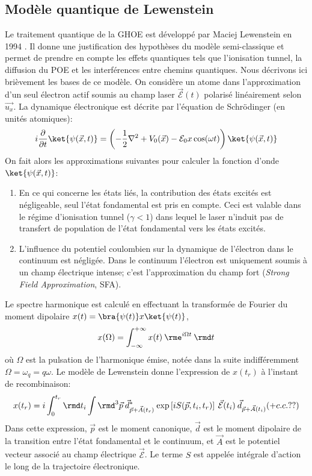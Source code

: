 \subsection{Modèle quantique de Lewenstein}
Le traitement quantique de la GHOE est développé par Maciej Lewenstein en 1994 . Il donne une justification des hypothèses du modèle semi-classique et permet de prendre en compte les effets quantiques tels que l'ionisation tunnel, la diffusion du POE et les interférences entre chemins quantiques. Nous décrivons ici brièvement les bases de ce modèle. On considère un atome dans l'approximation d'un seul électron actif soumis au champ laser $\vec{\mathcal{E}}(t)$ polarisé linéairement selon $\vec{u_x}$. La dynamique électronique est décrite par l'équation de Schrödinger (en unités atomiques):
\begin{equation}
i \frac{\partial}{\partial t} \ket{\psi(\vec{x},t)} = \left( -\frac{1}{2}\nabla^2 + V_0(\vec{x}) - \mathcal{E}_0 x \cos(\omega t) \right) \ket{\psi(\vec{x},t)}
\end{equation} 
On fait alors les approximations suivantes pour calculer la fonction d'onde $\ket{\psi(\vec{x},t)}$:
\begin{enumerate}
\item En ce qui concerne les états liés, la contribution des états excités est négligeable, seul l'état fondamental est pris en compte. Ceci est valable dans le régime d'ionisation tunnel ($\gamma <1$) dans lequel le laser n'induit pas de transfert de population de l'état fondamental vers les états excités.
\item L'influence du potentiel coulombien sur la dynamique de l'électron dans le continuum est négligée. Dans le continuum l'électron est uniquement soumis à un champ électrique intense; c'est l'approximation du champ fort (\textit{Strong Field Approximation}, SFA).
\end{enumerate}
Le spectre harmonique est calculé en effectuant la transformée de Fourier du moment dipolaire $x(t) =\bra{\psi(t)} x \ket{\psi(t)}$,
\begin{equation}
x(\Omega) = \int_{-\infty}^{+\infty} x(t) \: \rme^{i \Omega t}  \: \rmd t
\end{equation}
où $\Omega$ est la pulsation de l'harmonique émise, notée dans la suite indifféremment $\Omega = \omega_q = q \omega$. Le modèle de Lewenstein donne l'expression de $x(t_r)$ à l'instant de recombinaison:
\begin{equation}
x(t_r) = i \int_0^{t_r} \rmd t_i \int \rmd^3 \vec{p} \: \vec{d}^*_{\vec{p}+\vec{A}(t_r)} \: \text{exp}\left[i S(\vec{p}, t_i, t_r) \right] \: \vec{\mathcal{E}}(t_i) \: \vec{d}_{\vec{p}+\vec{A}(t_i)} (+ c.c. ??)
\label{eq:x_Lew}
\end{equation}
Dans cette expression, $\vec{p}$ est le moment canonique, $\vec{d}$ est le moment dipolaire de la transition entre l'état fondamental et le continuum, et $\vec{A}$ est le potentiel vecteur associé au champ électrique $\vec{\mathcal{E}}$. Le terme $S$ est appelée intégrale d'action le long de la trajectoire électronique. 

